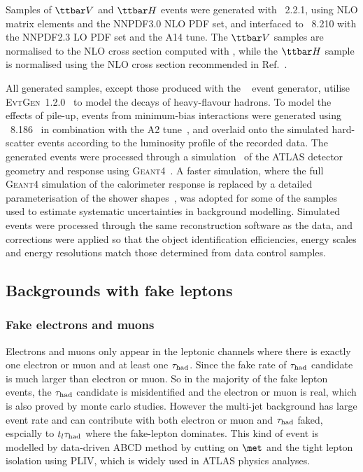 Samples of $\ttbar V$ and $\ttbar H$ events were generated with {\amcatnlo}~2.2.1, using NLO matrix elements and the NNPDF3.0 NLO PDF set,
and interfaced to {\pythia}~8.210 with the NNPDF2.3 LO PDF set and the A14 tune. 
The $\ttbar V$ samples are normalised to the NLO cross section computed with {\amcatnlo}, while the $\ttbar H$ sample is normalised using 
the NLO cross section recommended in Ref.~\cite{deFlorian:2016spz}.

All generated samples, except those produced with the {\sherpa}~\cite{Gleisberg:2008ta} event generator, 
utilise \textsc{EvtGen}~1.2.0~\cite{Lange:2001uf} to model the decays of heavy-flavour hadrons. 
To model the effects of pile-up, events from minimum-bias interactions were generated using {\pythia}~8.186~\cite{Sjostrand:2007gs}  
in combination with the A2 tune~\cite{ATL-PHYS-PUB-2011-014}, 
and overlaid onto the simulated hard-scatter events according to the luminosity profile of the recorded data. 
The generated events were processed through a simulation~\cite{Aad:2010ah} of the ATLAS detector geometry and response 
using \textsc{Geant4}~\cite{Agostinelli:2002hh}. A faster simulation, where the full \textsc{Geant4} simulation of
the calorimeter response is replaced by a detailed parameterisation of the shower shapes~\cite{FastCaloSim},
was adopted for some of the samples used to estimate systematic uncertainties in background modelling.
Simulated events were processed through the same reconstruction software as the data, and corrections were applied so that the object identification 
efficiencies, energy scales and energy resolutions match those determined from data control samples.

\subsection{Backgrounds with fake leptons}
\label{sec:fakeleptons}

\subsubsection{Fake electrons and muons}
Electrons and muons only appear in the leptonic channels where there is exactly one electron or muon and at least one $\tau_{\mathrm{had}}$. Since the fake rate of $\tau_{\mathrm{had}}$ candidate is much larger than electron or muon. So in the majority of the fake lepton events, the $\tau_{\mathrm{had}}$ candidate is misidentified and the electron or muon is real, which is also proved by monte carlo studies. However the multi-jet background has large event rate and can contribute with both electron or muon and $\tau_{\mathrm{had}}$ faked, espcially to $t_l\tau_{\mathrm{had}}$ where the fake-lepton dominates.
This kind of event is modelled by data-driven ABCD method by cutting on $\met$ and the tight lepton isolation using PLIV, which is widely used in ATLAS physics analyses.

